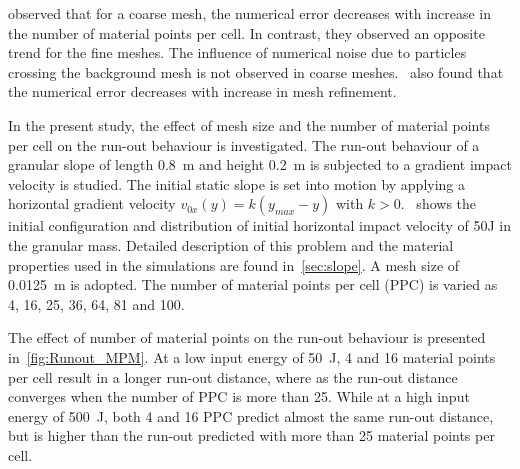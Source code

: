 \citet{Abe2013} observed that for a coarse mesh, the numerical error 
decreases with increase in the number of material points per cell. In contrast, 
they observed an opposite trend for the fine meshes. The influence of numerical 
noise due to particles crossing the background mesh is not observed in coarse 
meshes.~\citet{Coetzee2005} also found that the numerical error decreases 
with increase in mesh refinement.

In the present study, the effect of mesh size and the number of material points 
per cell on the run-out behaviour is investigated. The run-out behaviour of  a 
granular slope of length 0.8~\si{\m} and height 0.2~\si{\m} is subjected to a 
gradient impact velocity is studied. The initial 
static slope is set into motion by applying a horizontal
gradient velocity $v_{0x}(y) = k (y_{max} - y)$ with 
$k>0$.~ shows the initial configuration and 
distribution of initial horizontal impact velocity of 50J in the granular mass. 
Detailed description of this problem and the material properties used in the 
simulations are found in~\cref{sec:slope}.
A mesh size of 0.0125~\si{\m} is adopted. The number of material points per 
cell (PPC) is varied as 4, 16, 25, 36, 64, 81 and 100.

The effect of number of material points on the run-out 
behaviour is presented in~\cref{fig:Runout_MPM}. At a low input energy of 
50~\si{\J}, 4 and 16 material points per cell result in a longer run-out 
distance, where as the 
run-out distance converges when the number of PPC is more 
than 25. While at a high input energy of 500~\si{J}, both 4 and 16 PPC predict 
almost the same run-out distance, but is higher than the run-out predicted 
with more than 25 material points per cell. 

